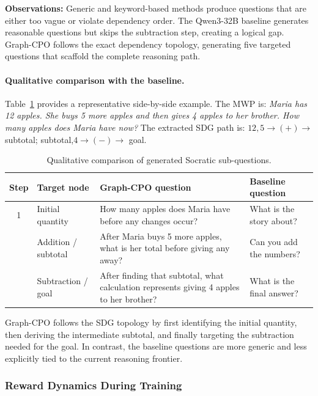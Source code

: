 \documentclass[sigconf, anonymous, review, screen]{acmart}
\begin{document}
\textbf{Observations:} Generic and keyword-based methods produce questions that are either too vague or violate dependency order. The Qwen3-32B baseline generates reasonable questions but skips the subtraction step, creating a logical gap. Graph-CPO follows the exact dependency topology, generating five targeted questions that scaffold the complete reasoning path.

\paragraph{Qualitative comparison with the baseline.}
Table~\ref{tab:qual_example} provides a representative side-by-side example. The MWP is:
\textit{Maria has 12 apples. She buys 5 more apples and then gives 4 apples to her brother. How many apples does Maria have now?}
The extracted SDG path is:
$12,5 \rightarrow (+) \rightarrow$ subtotal; subtotal,$4 \rightarrow (-) \rightarrow$ goal.

\begin{table}[H]
\centering
\footnotesize
\caption{Qualitative comparison of generated Socratic sub-questions.}
\label{tab:qual_example}

\begin{tabularx}{\linewidth}{c l X X}
\toprule
\textbf{Step} & \textbf{Target node} & \textbf{Graph-CPO question} & \textbf{Baseline question} \\
\midrule
1 & Initial quantity
& How many apples does Maria have before any changes occur?
& What is the story about? \\
\addlinespace
2 & Addition / subtotal
& After Maria buys 5 more apples, what is her total before giving any away?
& Can you add the numbers? \\
\addlinespace
3 & Subtraction / goal
& After finding that subtotal, what calculation represents giving 4 apples to her brother?
& What is the final answer? \\
\bottomrule
\end{tabularx}

\end{table}

Graph-CPO follows the SDG topology by first identifying the initial quantity, then deriving the intermediate subtotal, and finally targeting the subtraction needed for the goal. In contrast, the baseline questions are more generic and less explicitly tied to the current reasoning frontier.

\subsubsection{Reward Dynamics During Training}
\end{document}
